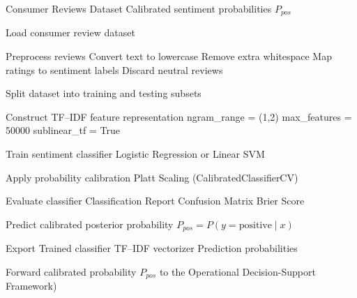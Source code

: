 \documentclass[authoryear,review,3p,times,12pt]{elsarticle}
\begin{document}
\begin{algorithm}
\caption{Sentiment NLP Pipeline}
\label{alg:sentiment_pipeline}
\begin{algorithmic}[1]

\Require Consumer Reviews Dataset
\Ensure Calibrated sentiment probabilities $P_{pos}$

\State Load consumer review dataset

\State Preprocess reviews
\Statex \hspace{\algorithmicindent}
Convert text to lowercase
\Statex \hspace{\algorithmicindent}
Remove extra whitespace
\Statex \hspace{\algorithmicindent}
Map ratings to sentiment labels
\Statex \hspace{\algorithmicindent}
Discard neutral reviews

\State Split dataset into training and testing subsets

\State Construct TF--IDF feature representation
\Statex \hspace{\algorithmicindent}
ngram\_range = (1,2)
\Statex \hspace{\algorithmicindent}
max\_features = 50000
\Statex \hspace{\algorithmicindent}
sublinear\_tf = True

\State Train sentiment classifier
\Statex \hspace{\algorithmicindent}
Logistic Regression or Linear SVM

\State Apply probability calibration
\Statex \hspace{\algorithmicindent}
Platt Scaling (CalibratedClassifierCV)

\State Evaluate classifier
\Statex \hspace{\algorithmicindent}
Classification Report
\Statex \hspace{\algorithmicindent}
Confusion Matrix
\Statex \hspace{\algorithmicindent}
Brier Score

\State Predict calibrated posterior probability $ P_{pos}=P(y=\mathrm{positive}\mid x) $

\State Export
\Statex \hspace{\algorithmicindent}
Trained classifier
\Statex \hspace{\algorithmicindent}
TF--IDF vectorizer
\Statex \hspace{\algorithmicindent}
Prediction probabilities

\State Forward calibrated probability $P_{pos}$ to the Operational Decision-Support Framework)

\end{algorithmic}
\end{algorithm}
\end{document}
